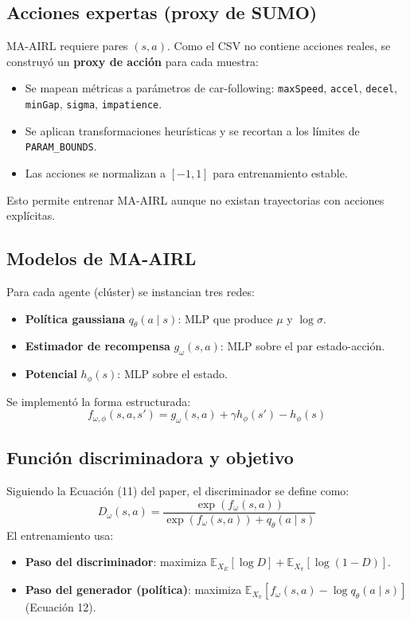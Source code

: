 \subsection{Acciones expertas (proxy de SUMO)}
MA-AIRL requiere pares $(s, a)$. Como el CSV no contiene acciones reales, se construyó un \textbf{proxy de acción} para cada muestra:
\begin{itemize}
\item Se mapean métricas a parámetros de car-following: \texttt{maxSpeed}, \texttt{accel}, \texttt{decel}, \texttt{minGap}, \texttt{sigma}, \texttt{impatience}.
\item Se aplican transformaciones heurísticas y se recortan a los límites de \texttt{PARAM\_BOUNDS}.
\item Las acciones se normalizan a $[-1,1]$ para entrenamiento estable.
\end{itemize}
Esto permite entrenar MA-AIRL aunque no existan trayectorias con acciones explícitas.

\subsection{Modelos de MA-AIRL}
Para cada agente (clúster) se instancian tres redes:
\begin{itemize}
\item \textbf{Política gaussiana} $q_\theta(a \mid s)$: MLP que produce $\mu$ y $\log\sigma$.
\item \textbf{Estimador de recompensa} $g_\omega(s,a)$: MLP sobre el par estado-acción.
\item \textbf{Potencial} $h_\phi(s)$: MLP sobre el estado.
\end{itemize}
Se implementó la forma estructurada:
\[
f_{\omega,\phi}(s,a,s') = g_\omega(s,a) + \gamma h_\phi(s') - h_\phi(s)
\]

\subsection{Función discriminadora y objetivo}
Siguiendo la Ecuación (11) del paper, el discriminador se define como:
\[
D_{\omega}(s,a)=\frac{\exp(f_{\omega}(s,a))}{\exp(f_{\omega}(s,a)) + q_\theta(a \mid s)}
\]
El entrenamiento usa:
\begin{itemize}
\item \textbf{Paso del discriminador}: maximiza $\mathbb{E}_{X_E}[\log D] + \mathbb{E}_{X_\pi}[\log(1-D)]$.
\item \textbf{Paso del generador (política)}: maximiza $\mathbb{E}_{X_\pi}[f_\omega(s,a) - \log q_\theta(a \mid s)]$ (Ecuación 12).
\end{itemize}

